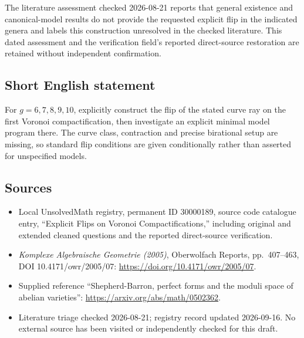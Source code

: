 \documentclass[11pt]{article}
\begin{document}
The literature assessment checked 2026-08-21 reports that general existence and canonical-model results do not provide the requested explicit flip in the indicated genera and labels this construction unresolved in the checked literature. This dated assessment and the verification field's reported direct-source restoration are retained without independent confirmation.
\subsection{Short English statement}
For \(g=6,7,8,9,10\), explicitly construct the flip of the stated curve ray on the first Voronoi compactification, then investigate an explicit minimal model program there. The curve class, contraction and precise birational setup are missing, so standard flip conditions are given conditionally rather than asserted for unspecified models.
\subsection{Sources}
\begin{itemize}
\item Local UnsolvedMath registry, permanent ID 30000189, source code catalogue entry, ``Explicit Flips on Voronoi Compactifications,'' including original and extended cleaned questions and the reported direct-source verification.
\item \emph{Komplexe Algebraische Geometrie (2005)}, Oberwolfach Reports, pp.\ 407--463, DOI 10.4171/owr/2005/07: \url{https://doi.org/10.4171/owr/2005/07}.
\item Supplied reference ``Shepherd-Barron, perfect forms and the moduli space of abelian varieties'': \url{https://arxiv.org/abs/math/0502362}.
\item Literature triage checked 2026-08-21; registry record updated 2026-09-16. No external source has been visited or independently checked for this draft.
\end{itemize}
\end{document}
